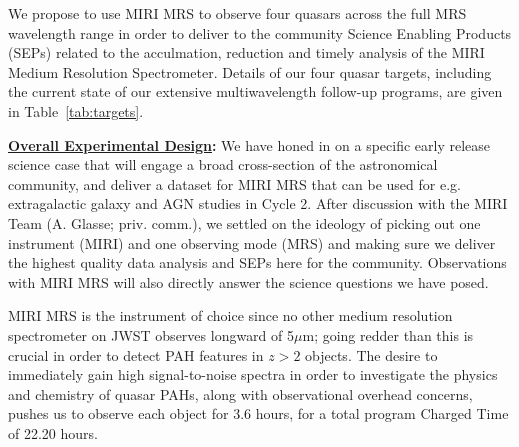 \smallskip \smallskip
\noindent
We propose to use MIRI MRS to observe four quasars across the full MRS
wavelength range in order to deliver to the community Science Enabling
Products (SEPs) related to the acculmation, reduction and timely
analysis of the MIRI Medium Resolution Spectrometer. Details of our
four quasar targets, including the current state of our extensive
multiwavelength follow-up programs, are given in
Table~\ref{tab:targets}.


\smallskip \smallskip
\noindent
{\bf \underline{Overall Experimental Design}:} 
We have honed in on a specific early release science case that will
engage a broad cross-section of the astronomical community, and
deliver a dataset for MIRI MRS that can be used for e.g. extragalactic
galaxy and AGN studies in Cycle 2.  After discussion with the MIRI
Team (A. Glasse; priv. comm.), we settled on the ideology of picking
out one instrument (MIRI) and one observing mode (MRS) and making sure
we deliver the highest quality data analysis and SEPs here for the
community. Observations with MIRI MRS will also directly answer the
science questions we have posed.

\smallskip \smallskip
\noindent
MIRI MRS is the instrument of choice since no other medium resolution
spectrometer on JWST observes longward of 5$\mu$m; going redder than
this is crucial in order to detect PAH features in $z > 2$
objects. The desire to immediately gain high signal-to-noise spectra
in order to investigate the physics and chemistry of quasar PAHs,
along with observational overhead concerns, pushes us to observe each
object for 3.6 hours, for a total program Charged Time of 22.20 hours.


